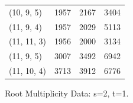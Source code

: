 \documentclass{amsart}
\numberwithin{equation}{section}
\numberwithin{figure}{section}
\numberwithin{table}{section}
\theoremstyle{definition}
\begin{document}
\begin{figure}
\begin{tabular}{|p{2cm}||p{3cm}|p{3cm}|p{3cm}|}
(10, 9, 5)  & 1957 & 2167 & 3404 \\

(11, 9, 4)  & 1957 & 2029 & 5113 \\

(11, 11, 3) & 1956 & 2000 & 3134 \\

(11, 9, 5)  & 3007 & 3492 & 6942 \\

(11, 10, 4) & 3713 & 3912 & 6776 \\

\hline

\end{tabular}

\caption{\label{fig:21} Root Multiplicity Data: s=2, t=1.}

\end{figure}
\end{document}
